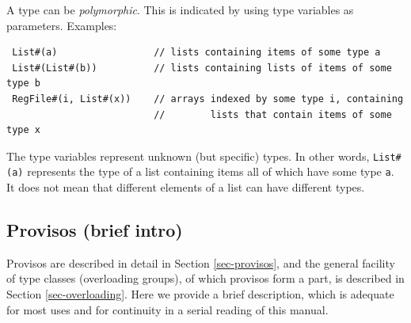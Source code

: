 \documentclass[twoside,letterpaper]{article}
\begin{document}
\label{sec-polymorphism-brief}

A type can be {\emph{polymorphic}}.
This is indicated by using type variables as parameters.
Examples:
\begin{verbatim}
 List#(a)                 // lists containing items of some type a
 List#(List#(b))          // lists containing lists of items of some type b
 RegFile#(i, List#(x))    // arrays indexed by some type i, containing
                          //        lists that contain items of some type x
\end{verbatim}
The type variables represent unknown (but specific) types.  In other
words, \texttt{List\#(a)} represents the type of a list containing items
all of which have some type \texttt{a}.  It does not mean that different
elements of a list can have different types.


\subsection{Provisos (brief intro)}

\label{sec-provisos-brief}


Provisos are described in detail in Section \ref{sec-provisos}, and
the general facility of type classes (overloading groups), of which
provisos form a part, is described in Section \ref{sec-overloading}.
Here we provide a brief description, which is adequate for most uses
and for continuity in a serial reading of this manual.
\end{document}
